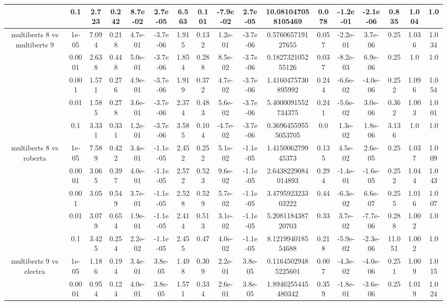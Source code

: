 \begin{tabular}{|c|c|c|c|c|c|c|c|c|c|c|c|c|c|c|c|c|}
 & 0.1 & 2.723 & 0.242 & 8.7e-02 & 2.7e-05 & 6.563 & 0.101 & -7.9e-02 & 2.7e-05 & 10.081047058105469 & 0.078 & -1.2e-01 & -2.1e-06 & 0.835 & 1.004 & 1.0 \\
\hline
\multirow{5}{*}{multiberts 8 vs multiberts 9} & 1e-05 & 7.094 & 0.218 & 4.7e-01 & -3.7e-06 & 1.915 & 0.132 & 1.2e-01 & -3.7e-06 & 0.576065719127655 & 0.057 & -2.2e-01 & 3.7e-06 & 0.25 & 1.036 & 1.034 \\
 & 0.0001 & 2.638 & 0.448 & 5.0e-01 & -3.7e-06 & 1.854 & 0.288 & 8.5e-02 & -3.7e-06 & 0.182732105255126 & 0.037 & -8.2e-03 & 6.9e-06 & 0.25 & 1.0 & 1.0 \\
 & 0.001 & 1.571 & 0.276 & 4.9e-01 & -3.7e-06 & 1.919 & 0.372 & 4.7e-02 & -3.7e-06 & 1.4160475730895992 & 0.244 & -6.6e-02 & -4.0e-06 & 0.252 & 1.096 & 1.054 \\
 & 0.01 & 1.585 & 0.278 & 3.6e-01 & -3.7e-06 & 2.374 & 0.483 & 5.6e-02 & -3.7e-06 & 5.4000091552734375 & 0.241 & -5.6e-02 & 3.0e-06 & 0.362 & 1.003 & 1.001 \\
 & 0.1 & 3.331 & 0.331 & 1.2e-01 & -3.7e-06 & 3.585 & 0.104 & -4.7e-02 & -3.7e-06 & 0.36964559555053705 & 0.0 & 1.3e-02 & 1.8e-06 & 3.136 & 1.0 & 1.0 \\
\hline
\multirow{5}{*}{multiberts 8 vs roberta } & 1e-05 & 7.589 & 0.422 & 3.4e-01 & -1.1e-05 & 2.452 & 0.252 & 5.1e-02 & -1.1e-05 & 1.415006279945373 & 0.135 & 4.5e-02 & 2.6e-05 & 0.25 & 1.037 & 1.009 \\
 & 0.0001 & 3.065 & 0.397 & 4.0e-01 & -1.1e-05 & 2.572 & 0.523 & 9.6e-02 & -1.1e-05 & 2.6438229084014893 & 0.294 & -1.4e-01 & -1.6e-05 & 0.252 & 1.044 & 1.043 \\
 & 0.001 & 3.05 & 0.549 & 3.7e-01 & -1.1e-05 & 2.528 & 0.529 & 5.7e-02 & -1.1e-05 & 3.479592323303222 & 0.44 & -6.3e-02 & 6.6e-07 & 0.255 & 1.016 & 1.007 \\
 & 0.01 & 3.079 & 0.654 & 1.9e-01 & -1.1e-05 & 2.414 & 0.513 & 3.1e-02 & -1.1e-05 & 5.208118438720703 & 0.33 & 3.7e-02 & -7.7e-06 & 0.288 & 1.002 & 1.0 \\
 & 0.1 & 3.425 & 0.254 & 2.2e-02 & -1.1e-05 & 2.455 & 0.47 & 4.0e-02 & -1.1e-05 & 8.121994018554688 & 0.218 & -5.9e-02 & -2.3e-06 & 11.051 & 1.002 & 1.0 \\
\hline
\multirow{5}{*}{multiberts 9 vs electra } & 1e-05 & 1.186 & 0.194 & 3.4e-01 & 3.8e-05 & 1.498 & 0.309 & 2.2e-01 & 3.8e-05 & 0.11645029485225601 & 0.007 & -4.3e-02 & -4.0e-06 & 0.251 & 1.009 & 1.015 \\
 & 0.0001 & 0.954 & 0.124 & 4.0e-01 & 3.8e-05 & 1.571 & 0.334 & 2.6e-01 & 3.8e-05 & 1.8946255445480342 & 0.359 & -1.8e-01 & -3.6e-06 & 0.25 & 1.019 & 1.024 \\

\end{tabular}
